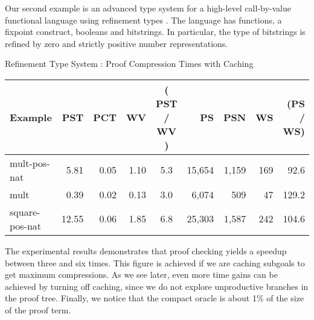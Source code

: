 \documentclass{llncs}
\begin{document}
Our second example is an advanced type system for a high-level
call-by-value functional language using refinement types
\cite{davies+:intersection}. The language has functions, a fixpoint
construct, booleans and bitstrings. In particular, the type of  
bitstrings is refined by zero and strictly positive number
representations.

\begin{center}
\begin{small}
Refinement Type System : Proof Compression Times with Caching
\begin{tabular}{|l|r|r|r|c|r|r|r|r|}
\hline
Example & PST 
& PCT & WV & ( PST / WV ) & PS & PSN & WS & (PS / WS)\\
\hline
mult-pos-nat & 5.81 & 0.05 & 1.10 & 5.3
& 15,654 & 1,159 & 169 & 92.6\\
mult & 0.39 & 0.02 & 0.13 & 3.0
& 6,074 & 509 & 47 & 129.2\\
square-pos-nat & 12.55 & 0.06 & 1.85 & 6.8 
& 25,303 & 1,587 & 242 & 104.6\\
\hline
\end{tabular}
\end{small}
\end{center}

The experimental results demonstrates that proof checking yields a
speedup between three and six times. This figure is achieved if we are
caching subgoals to get maximum compressions. As we see later, even
more time gains can be achieved by turning off caching, since we do
not explore unproductive branches in the proof tree.
%
Finally, %
we notice that the compact oracle is about 1\% of the size of the
proof term.%
\end{document}
